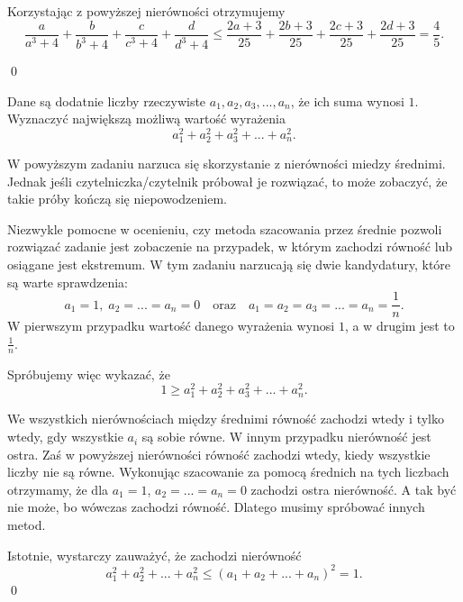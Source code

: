 \noindent 
Korzystając z powyższej nierówności otrzymujemy
\[
    \frac{a}{a^3 + 4} + \frac{b}{b^3 + 4} + \frac{c}{c^3 + 4} + \frac{d}{d^3 + 4} \leqslant \frac{2a + 3}{25} + \frac{2b + 3}{25} + \frac{2c + 3}{25} + \frac{2d + 3}{25} = \frac{4}{5}.
\]

\qed

\vspace{5px}


\noindent
Dane są dodatnie liczby rzeczywiste $a_1, a_2, a_3, ..., a_n$, że ich suma wynosi $1$. Wyznaczyć największą możliwą wartość wyrażenia
\[
    a_1^2 + a_2^2 + a_3^2 + ... + a_n^2.
\]

\newpage
{}

\noindent
W powyższym zadaniu narzuca się skorzystanie z nierówności miedzy średnimi. Jednak jeśli czytelniczka/czytelnik próbował je rozwiązać, to może zobaczyć, że takie próby kończą się niepowodzeniem.

\vspace{10px}
\noindent
Niezwykle pomocne w ocenieniu, czy metoda szacowania przez średnie pozwoli rozwiązać zadanie jest zobaczenie na przypadek, w którym zachodzi równość lub osiągane jest ekstremum. W tym zadaniu narzucają się dwie kandydatury, które są warte sprawdzenia:
\[
    a_1 = 1, \; a_2 = ... = a_n = 0 \quad \text{oraz} \quad a_1 = a_2 = a_3 = ... = a_n = \frac{1}{n}.
\]
W pierwszym przypadku wartość danego wyrażenia wynosi $1$, a w drugim jest to $\frac{1}{n}$.

\vspace{10px}
\noindent
Spróbujemy więc wykazać, że
\[
    1 \geqslant a_1^2 + a_2^2 + a_3^2 + ... + a_n^2.
\]

\noindent
We wszystkich nierównościach między średnimi równość zachodzi wtedy i tylko wtedy, gdy wszystkie $a_i$ są sobie równe. W innym przypadku nierówność jest ostra. Zaś w powyższej nierówności równość zachodzi wtedy, kiedy wszystkie liczby nie są równe. Wykonując szacowanie za pomocą średnich na tych liczbach otrzymamy, że dla $a_1 = 1$,  ${a_2 = ... = a_n = 0}$ zachodzi ostra nierówność. A tak być nie może, bo wówczas zachodzi równość. Dlatego musimy spróbować innych metod.

\noindent 
Istotnie, wystarczy zauważyć, że zachodzi nierówność
\[
    a_1^2 + a_2^2 + ... + a_n^2 \leqslant (a_1 + a_2 + ... + a_n)^2 = 1.
\]
\qed

\vspace{10px}

